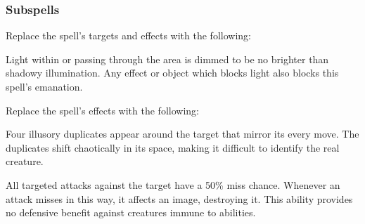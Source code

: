 \subsubsection{Subspells}





Replace the spell's targets and effects with the following:
\begin{spellcontent}

\begin{augmenttargetinginfo}


\end{augmenttargetinginfo}


\begin{augmenteffects}



\spelleffect
Light within or passing through the area is dimmed to be no brighter than shadowy illumination.
Any effect or object which blocks light also blocks this spell's emanation.








\end{augmenteffects}

\end{spellcontent}








Replace the spell's effects with the following:
\begin{spellcontent}

\begin{augmenteffects}



\spelleffect
Four illusory duplicates appear around the target that mirror its every move.
The duplicates shift chaotically in its space, making it difficult to identify the real creature.

All targeted attacks against the target have a 50\% miss chance.
Whenever an attack misses in this way, it affects an image, destroying it.
This ability provides no defensive benefit against creatures immune to  abilities.








\end{augmenteffects}

\end{spellcontent}





